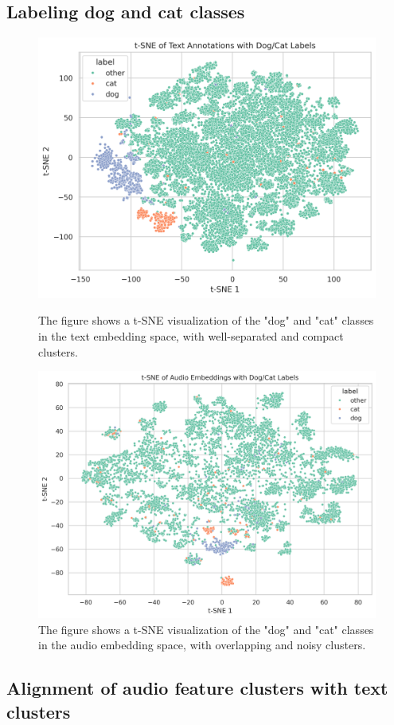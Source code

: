 \documentclass{article}
\begin{document}
\subsection{Labeling dog and cat classes}
\begin{figure}[H]
  \centering
  \begin{minipage}{0.45\textwidth} %
    \centering
    \includegraphics[width=0.5\linewidth]{figures/text_features/text_dogcat.png}
    \caption{The figure shows a t-SNE visualization of the "dog" and "cat" classes in the text embedding space, with well-separated and compact clusters.}
    \label{fig:silhouette}
  \end{minipage} \hspace{0.05\textwidth} %
  \begin{minipage}{0.45\textwidth} %
    \centering
    \includegraphics[width=0.5\linewidth]{figures/text_features/audio_dogcat.png}
    \caption{The figure shows a t-SNE visualization of the "dog" and "cat" classes in the audio embedding space, with overlapping and noisy clusters.}
    \label{fig:cluster_comp}
  \end{minipage}
\end{figure}

\subsection{Alignment of audio feature clusters with text clusters}
\end{document}
